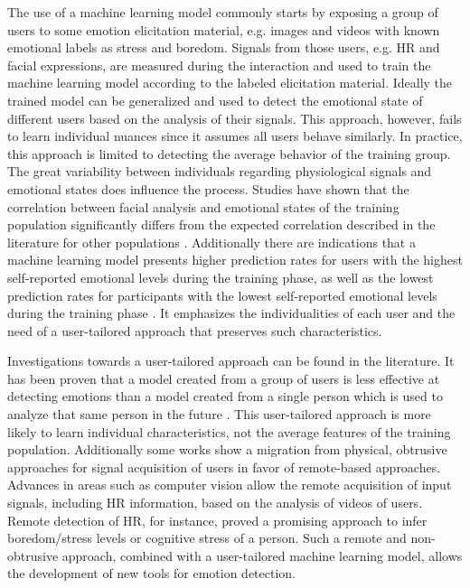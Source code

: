 The use of a machine learning model commonly starts by exposing a group of users to some emotion elicitation material, e.g. images and videos with known emotional labels as stress and boredom. Signals from those users, e.g. HR and facial expressions, are measured during the interaction and used to train the machine learning model according to the labeled elicitation material. Ideally the trained model can be generalized and used to detect the emotional state of different users based on the analysis of their signals. This approach, however, fails to learn individual nuances since it assumes all users behave similarly. In practice, this approach is limited to detecting the average behavior of the training group. The great variability between individuals regarding physiological signals and emotional states does influence the process. Studies have shown that the correlation between facial analysis and emotional states of the training population significantly differs from the expected correlation described in the literature for other populations \parencite{grafsgaard2013automatically}. Additionally there are indications that a machine learning model presents higher prediction rates for users with the highest self-reported emotional levels during the training phase, as well as the lowest prediction rates for participants with the lowest self-reported emotional levels during the training phase \parencite{mcduffcogcam}. It emphasizes the individualities of each user and the need of a user-tailored approach that preserves such characteristics.

Investigations towards a user-tailored approach can be found in the literature. It has been proven that a model created from a group of users is less effective at detecting emotions than a model created from a single person which is used to analyze that same person in the future \parencite{bailenson2008real}. This user-tailored approach is more likely to learn individual characteristics, not the average features of the training population. Additionally some works show a migration from physical, obtrusive approaches for signal acquisition of users in favor of remote-based approaches. Advances in areas such as computer vision allow the remote acquisition of input signals, including HR information, based on the analysis of videos of users. Remote detection of HR, for instance, proved a promising approach to infer boredom/stress levels \parencite{kukolja2014comparative} or cognitive stress \parencite{mcduff2014remote} of a person. Such a remote and non-obtrusive approach, combined with a user-tailored machine learning model, allows the development of new tools for emotion detection.


